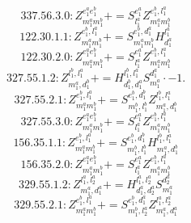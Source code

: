\documentclass[letterpaper,10pt,fleqn,leqno,onecolumn]{article}
\begin{document}
\begin{equation} \;\;\;\;\;\;  337.56.3.0: Z^{e_{1}^{a}e_{1}^{b}}_{m_{1}^{a}m_{1}^{b}}+=S^{e_{1}^{a}}_{l_{1}^{a}}Z^{e_{1}^{b},l_{1}^{a}}_{m_{1}^{a}m_{1}^{b}} \end{equation}
\begin{equation} \;\;\;\;\;\;  122.30.1.1: Z^{e_{1}^{b},l_{1}^{a}}_{m_{1}^{a}m_{1}^{b}}+=S^{e_{1}^{b},d_{1}^{a}}_{m_{1}^{a}m_{1}^{b}}H^{l_{1}^{a}}_{d_{1}^{a}} \end{equation}
\begin{equation} \;\;\;\;\;\;  122.30.2.0: Z^{e_{1}^{a}e_{1}^{b}}_{m_{1}^{a}m_{1}^{b}}+=S^{e_{1}^{a}}_{l_{1}^{a}}Z^{e_{1}^{b},l_{1}^{a}}_{m_{1}^{a}m_{1}^{b}} \end{equation}
\begin{equation} \;\;\;\;\;\;  327.55.1.2: Z^{l_{1}^{b},l_{1}^{a}}_{m_{1}^{a},d_{1}^{b}}+=H^{l_{1}^{b},l_{1}^{a}}_{d_{1}^{b},d_{1}^{a}}S^{d_{1}^{a}}_{m_{1}^{a}}\cdot -1. \end{equation}
\begin{equation} \;\;\;\;\;\;  327.55.2.1: Z^{e_{1}^{b},l_{1}^{a}}_{m_{1}^{a}m_{1}^{b}}+=S^{e_{1}^{b},d_{1}^{b}}_{m_{1}^{b},l_{1}^{b}}Z^{l_{1}^{b},l_{1}^{a}}_{m_{1}^{a},d_{1}^{b}} \end{equation}
\begin{equation} \;\;\;\;\;\;  327.55.3.0: Z^{e_{1}^{a}e_{1}^{b}}_{m_{1}^{a}m_{1}^{b}}+=S^{e_{1}^{a}}_{l_{1}^{a}}Z^{e_{1}^{b},l_{1}^{a}}_{m_{1}^{a}m_{1}^{b}} \end{equation}
\begin{equation} \;\;\;\;\;\;  156.35.1.1: Z^{e_{1}^{b},l_{1}^{a}}_{m_{1}^{a}m_{1}^{b}}+=S^{e_{1}^{b},d_{1}^{b}}_{m_{1}^{b},l_{1}^{b}}H^{l_{1}^{b},l_{1}^{a}}_{m_{1}^{a},d_{1}^{b}} \end{equation}
\begin{equation} \;\;\;\;\;\;  156.35.2.0: Z^{e_{1}^{a}e_{1}^{b}}_{m_{1}^{a}m_{1}^{b}}+=S^{e_{1}^{a}}_{l_{1}^{a}}Z^{e_{1}^{b},l_{1}^{a}}_{m_{1}^{a}m_{1}^{b}} \end{equation}
\begin{equation} \;\;\;\;\;\;  329.55.1.2: Z^{l_{1}^{a},l_{2}^{a}}_{m_{1}^{a},d_{1}^{a}}+=H^{l_{1}^{a},l_{2}^{a}}_{d_{1}^{a},d_{2}^{a}}S^{d_{2}^{a}}_{m_{1}^{a}} \end{equation}
\begin{equation} \;\;\;\;\;\;  329.55.2.1: Z^{e_{1}^{b},l_{1}^{a}}_{m_{1}^{a}m_{1}^{b}}+=S^{e_{1}^{b},d_{1}^{a}}_{m_{1}^{b},l_{2}^{a}}Z^{l_{1}^{a},l_{2}^{a}}_{m_{1}^{a},d_{1}^{a}} \end{equation}
\end{document}
